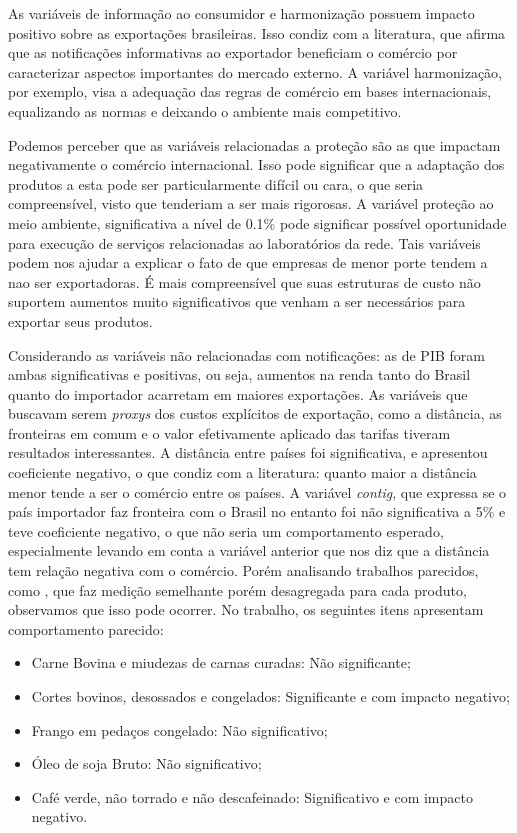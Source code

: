 \documentclass[12pt, a4paper]{article}
\begin{document}
 As variáveis de informação ao consumidor e harmonização possuem impacto positivo sobre as exportações brasileiras. Isso condiz com a literatura, que afirma que as notificações informativas ao exportador beneficiam o comércio por caracterizar aspectos importantes do mercado externo. A variável harmonização, por exemplo, visa a adequação das regras de comércio em bases internacionais, equalizando as normas e deixando o ambiente mais competitivo.

Podemos perceber que as variáveis relacionadas a proteção são as que impactam negativamente o comércio internacional. Isso pode significar que a adaptação dos produtos a esta pode ser particularmente difícil ou cara, o que seria compreensível, visto que tenderiam a ser mais rigorosas. A variável proteção ao meio ambiente, significativa a nível de 0.1\% pode significar possível oportunidade para execução de serviços relacionadas ao laboratórios da rede. Tais variáveis podem nos ajudar a explicar o fato de que empresas de menor porte tendem a nao ser exportadoras. É mais compreensível que suas estruturas de custo não suportem aumentos muito significativos que venham a ser necessários para exportar seus produtos.

Considerando as variáveis não relacionadas com notificações: as de PIB foram ambas significativas e positivas, ou seja, aumentos na renda tanto do Brasil quanto do importador acarretam em maiores exportações. As variáveis que buscavam serem \emph{proxys} dos custos explícitos de exportação, como a distância, as fronteiras em comum e o valor efetivamente aplicado das tarifas tiveram resultados interessantes. A distância entre países foi significativa, e apresentou coeficiente negativo, o que condiz com a literatura: quanto maior a distância menor tende a ser o comércio entre os países. A variável \emph{contig}, que expressa se o país importador faz fronteira com o Brasil no entanto foi não significativa a 5\% e teve coeficiente negativo, o que não seria um comportamento esperado, especialmente levando em conta a variável anterior que nos diz que a distância tem relação negativa com o comércio. Porém analisando trabalhos parecidos, como \cite{ALMEIDA2014}, que faz medição semelhante porém desagregada para cada produto, observamos que isso pode ocorrer. No trabalho, os seguintes itens apresentam comportamento parecido:

\begin{itemize}
    \item Carne Bovina e miudezas de carnas curadas: Não significante;
    \item Cortes bovinos, desossados e congelados: Significante e com impacto negativo;
    \item Frango em pedaços congelado: Não significativo;
    \item Óleo de soja Bruto: Não significativo;
    \item Café verde, não torrado e não descafeinado: Significativo e com impacto negativo.
\end{itemize}
\end{document}
